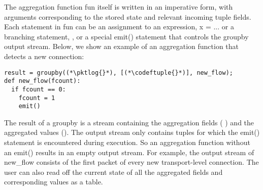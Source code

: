 The aggregation function {\ct fun} itself is written in an imperative form, with
arguments corresponding to the stored state and relevant incoming tuple
fields. Each statement in {\ct fun} can be an assignment to an expression, \ie
{\ct x = ...} or a branching statement, ,
or a special {\ct emit()} statement that controls the {\ct groupby} output
stream. Below, we show an example of an aggregation function that detects a new
connection:
\begin{lstlisting}
result = groupby((*\pktlog{}*), [(*\codeftuple{}*)], new_flow);
def new_flow(fcount):
  if fcount == 0:
    fcount = 1
    emit()
\end{lstlisting}
The result of a {\ct groupby} is a stream containing the aggregation fields (\ie
\txtftuple) and the aggregated values (). The output stream only
contains tuples for which the {\ct emit()} statement is encountered during
execution. So an aggregation function without an {\ct emit()} results in an empty
output stream. For example, the output stream of {\ct new\_flow} consists of the
first packet of every new transport-level connection. The user can also read off
the current state of all the aggregated fields and corresponding values as a table.

